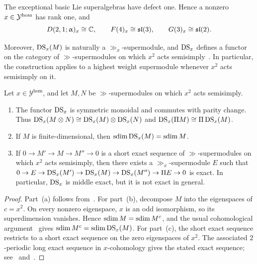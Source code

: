 The exceptional basic Lie superalgebras have defect one. Hence a nonzero $x\in{\mathcal Y}^{\hom}$ has rank one, and
\begin{equation}
D(2,1;\upalpha)_{x}\cong{\mathbb C},
\qquad
F(4)_{x}\cong{\mathfrak{sl}}(3),
\qquad
G(3)_{x}\cong{\mathfrak{sl}}(2).
\end{equation}

Moreover, $\operatorname{DS}_{x}(M)$ is naturally a $\gg_{x}$-supermodule, and $\operatorname{DS}_{x}$ defines a functor on the category of $\gg$-supermodules on which $x^{2}$ acts semisimply~\cite[Section~7.1]{GorelikSherman2024}. In particular, the construction applies to a highest weight supermodule whenever $x^{2}$ acts semisimply on it.

\begin{proposition}\label{prop::generalized_DS_properties}
Let $x\in\mathcal{Y}^{\mathrm{hom}}$, and let $M,N$ be $\gg$-supermodules on which $x^{2}$ acts semisimply.
\begin{enumerate}
\item[(a)] The functor $\operatorname{DS}_{x}$ is symmetric monoidal and commutes with parity change. Thus $\operatorname{DS}_{x}(M\otimes N)\cong\operatorname{DS}_{x}(M)\otimes\operatorname{DS}_{x}(N)$ and $\operatorname{DS}_{x}(\Pi M)\cong\Pi\operatorname{DS}_{x}(M)$.

\item[(b)] If $M$ is finite-dimensional, then $\operatorname{sdim}\operatorname{DS}_{x}(M)=\operatorname{sdim} M$.

\item[(c)] If $0\to M'\to M\to M''\to0$ is a short exact sequence of $\gg$-supermodules on which $x^{2}$ acts semisimply, then there exists a $\gg_{x}$-supermodule $E$ such that $0\to E\to\operatorname{DS}_{x}(M')\to\operatorname{DS}_{x}(M)\to\operatorname{DS}_{x}(M'')\to\Pi E\to0$ is exact. In particular, $\operatorname{DS}_{x}$ is middle exact, but it is not exact in general.
\end{enumerate}
\end{proposition}

\begin{proof}
Part~(a) follows from~\cite[Section~7.1]{GorelikSherman2024}. For part~(b), decompose $M$ into the eigenspaces of $c=x^{2}$. On every nonzero eigenspace, $x$ is an odd isomorphism, so its superdimension vanishes. Hence $\operatorname{sdim} M=\operatorname{sdim} M^{c}$, and the usual cohomological argument~\cite[Section~2]{gorelik2022duflo} gives $\operatorname{sdim} M^{c}=\operatorname{sdim}\operatorname{DS}_{x}(M)$. For part~(c), the short exact sequence restricts to a short exact sequence on the zero eigenspaces of $x^{2}$. The associated $2$-periodic long exact sequence in $x$-cohomology gives the stated exact sequence; see~\cite[Section~7.1.2]{GorelikSherman2024} and~\cite[Section~2]{gorelik2022duflo}.
\end{proof}


